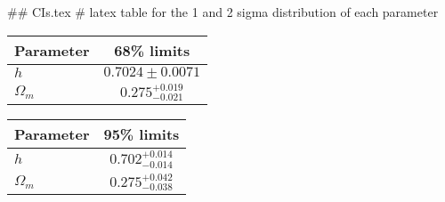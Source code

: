 ## CIs.tex
# latex table for the 1 and 2 sigma distribution of each parameter

\begin{tabular} { l  c}
 Parameter &  68\% limits\\
\hline
{\boldmath$h              $} & $0.7024\pm 0.0071          $\\
{\boldmath$\Omega_m       $} & $0.275^{+0.019}_{-0.021}   $\\
\hline
\end{tabular}

\begin{tabular} { l  c}
 Parameter &  95\% limits\\
\hline
{\boldmath$h              $} & $0.702^{+0.014}_{-0.014}   $\\
{\boldmath$\Omega_m       $} & $0.275^{+0.042}_{-0.038}   $\\
\hline
\end{tabular}
